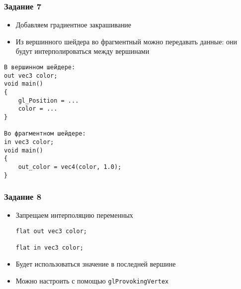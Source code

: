 \documentclass{beamer}
\begin{document}
\begin{frame}[fragile]
\frametitle{Задание 7}
\begin{itemize}
\item Добавляем градиентное закрашивание
\item Из вершинного шейдера во фрагментный можно передавать данные: они будут интерполироваться между вершинами
\end{itemize}
\pause
\begin{verbatim}
В вершинном шейдере:
out vec3 color;
void main()
{
    gl_Position = ...
    color = ...
}

Во фрагментном шейдере:
in vec3 color;
void main()
{
    out_color = vec4(color, 1.0);
}
\end{verbatim}
\end{frame}

\begin{frame}[fragile]
\frametitle{Задание 8}
\begin{itemize}
\item Запрещаем интерполяцию переменных
\pause
\begin{verbatim}
flat out vec3 color;

flat in vec3 color;
\end{verbatim}
\pause
\item Будет использоваться значение в последней вершине
\item Можно настроить с помощью \verb|glProvokingVertex|
\end{itemize}
\end{frame}
\end{document}
